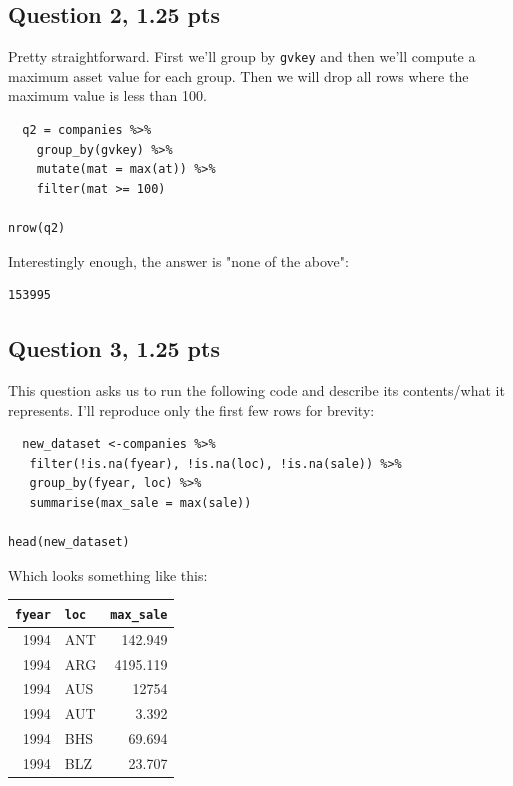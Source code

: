 \documentclass[11pt]{article}
\begin{document}
\subsection*{Question 2, 1.25 pts}
\label{sec:org46aade5}
Pretty straightforward.  First we'll group by \texttt{gvkey} and then we'll compute a maximum asset value for each group.  Then we will drop all rows where the maximum value is less than 100.

\begin{verbatim}
  q2 = companies %>%
    group_by(gvkey) %>%
    mutate(mat = max(at)) %>%
    filter(mat >= 100)

nrow(q2)
\end{verbatim}

Interestingly enough, the answer is "none of the above":

\begin{verbatim}
153995
\end{verbatim}

\subsection*{Question 3, 1.25 pts}
\label{sec:orgcceb239}
This question asks us to run the following code and describe its contents/what it represents.  I'll reproduce only the first few rows for brevity:

\begin{verbatim}
  new_dataset <-companies %>%
   filter(!is.na(fyear), !is.na(loc), !is.na(sale)) %>%
   group_by(fyear, loc) %>%
   summarise(max_sale = max(sale))

head(new_dataset)
\end{verbatim}

Which looks something like this:

\begin{center}
\begin{tabular}{rlr}
\texttt{fyear} & \texttt{loc} & \texttt{max\_sale}\\[0pt]
\hline
1994 & ANT & 142.949\\[0pt]
1994 & ARG & 4195.119\\[0pt]
1994 & AUS & 12754\\[0pt]
1994 & AUT & 3.392\\[0pt]
1994 & BHS & 69.694\\[0pt]
1994 & BLZ & 23.707\\[0pt]
\end{tabular}
\end{center}
\end{document}
